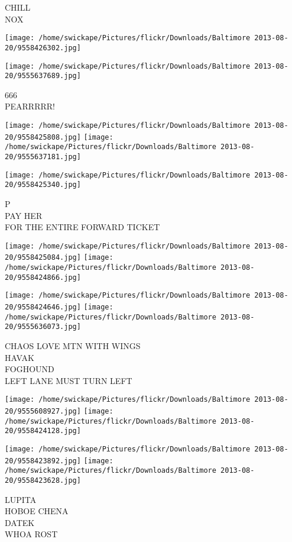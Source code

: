 \documentclass[10pt,letterpaper]{article}
\begin{document}
CHILL\\
NOX
\pagebreak

\texttt{[image: /home/swickape/Pictures/flickr/Downloads/Baltimore 2013-08-20/9558426302.jpg]}

\vspace{0.25in}
\texttt{[image: /home/swickape/Pictures/flickr/Downloads/Baltimore 2013-08-20/9555637689.jpg]}

666\\
PEARRRRR!
\pagebreak

\texttt{[image: /home/swickape/Pictures/flickr/Downloads/Baltimore 2013-08-20/9558425808.jpg]}
\texttt{[image: /home/swickape/Pictures/flickr/Downloads/Baltimore 2013-08-20/9555637181.jpg]}

\vspace{0.25in}
\texttt{[image: /home/swickape/Pictures/flickr/Downloads/Baltimore 2013-08-20/9558425340.jpg]}

P\\
PAY HER\\
FOR THE ENTIRE FORWARD TICKET
\pagebreak

\texttt{[image: /home/swickape/Pictures/flickr/Downloads/Baltimore 2013-08-20/9558425084.jpg]}
\texttt{[image: /home/swickape/Pictures/flickr/Downloads/Baltimore 2013-08-20/9558424866.jpg]}

\texttt{[image: /home/swickape/Pictures/flickr/Downloads/Baltimore 2013-08-20/9558424646.jpg]}
\texttt{[image: /home/swickape/Pictures/flickr/Downloads/Baltimore 2013-08-20/9555636073.jpg]}

CHAOS LOVE MTN WITH WINGS\\
HAVAK\\
FOGHOUND\\
LEFT LANE MUST TURN LEFT
\pagebreak

\texttt{[image: /home/swickape/Pictures/flickr/Downloads/Baltimore 2013-08-20/9555608927.jpg]}
\texttt{[image: /home/swickape/Pictures/flickr/Downloads/Baltimore 2013-08-20/9558424128.jpg]}

\texttt{[image: /home/swickape/Pictures/flickr/Downloads/Baltimore 2013-08-20/9558423892.jpg]}
\texttt{[image: /home/swickape/Pictures/flickr/Downloads/Baltimore 2013-08-20/9558423628.jpg]}

LUPITA\\
HOBOE CHENA\\
DATEK\\
WHOA ROST
\pagebreak
\end{document}

